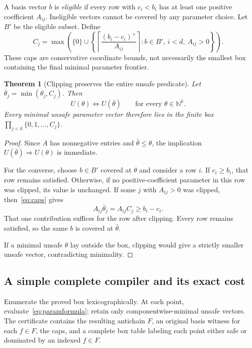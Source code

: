 \documentclass[11pt,a4paper]{article}
\newcommand{\N}{\mathbb N}
\newtheorem{theorem}{Theorem}[section]
\theoremstyle{definition}
\theoremstyle{remark}
\begin{document}
A basis vector $b$ is \emph{eligible} if every row with $c_i<b_i$ has at least one positive coefficient $A_{ij}$. Ineligible vectors cannot be covered by any parameter choice. Let $B'$ be the eligible subset. Define
\begin{equation}\label{eq:caps}
 C_j=\max\left(\{0\}\cup
 \left\{\left\lceil\frac{(b_i-c_i)^+}{A_{ij}}\right\rceil:
 b\in B',\ i<d,\ A_{ij}>0\right\}\right).
\end{equation}
These caps are conservative coordinate bounds, not necessarily the smallest box containing the final minimal parameter frontier.

\begin{theorem}[Clipping preserves the entire unsafe predicate]\label{thm:clip}
Let $\bar\theta_j=\min(\theta_j,C_j)$. Then
\begin{equation}\label{eq:clip}
 U(\theta)\iff U(\bar\theta)
 \qquad\text{for every }\theta\in\N^k.
\end{equation}
Every minimal unsafe parameter vector therefore lies in the finite box
$\prod_{j<k}\{0,1,\ldots,C_j\}$.
\end{theorem}
\begin{proof}
Since $A$ has nonnegative entries and $\bar\theta\le\theta$, the implication $U(\bar\theta)\Rightarrow U(\theta)$ is immediate.

For the converse, choose $b\in B'$ covered at $\theta$ and consider a row $i$. If $c_i\ge b_i$, that row remains satisfied. Otherwise, if no positive-coefficient parameter in this row was clipped, its value is unchanged. If some $j$ with $A_{ij}>0$ was clipped, then~\eqref{eq:caps} gives
\[
 A_{ij}\bar\theta_j=A_{ij}C_j\ge b_i-c_i.
\]
That one contribution suffices for the row after clipping. Every row remains satisfied, so the same $b$ is covered at $\bar\theta$.

If a minimal unsafe $\theta$ lay outside the box, clipping would give a strictly smaller unsafe vector, contradicting minimality.
\end{proof}

\subsection{A simple complete compiler and its exact cost}
Enumerate the proved box lexicographically. At each point, evaluate~\eqref{eq:paramformula}; retain only componentwise-minimal unsafe vectors. The certificate contains the resulting antichain $F$, an original basis witness for each $f\in F$, the caps, and a complete box table labeling each point either safe or dominated by an indexed $f\in F$.
\end{document}
